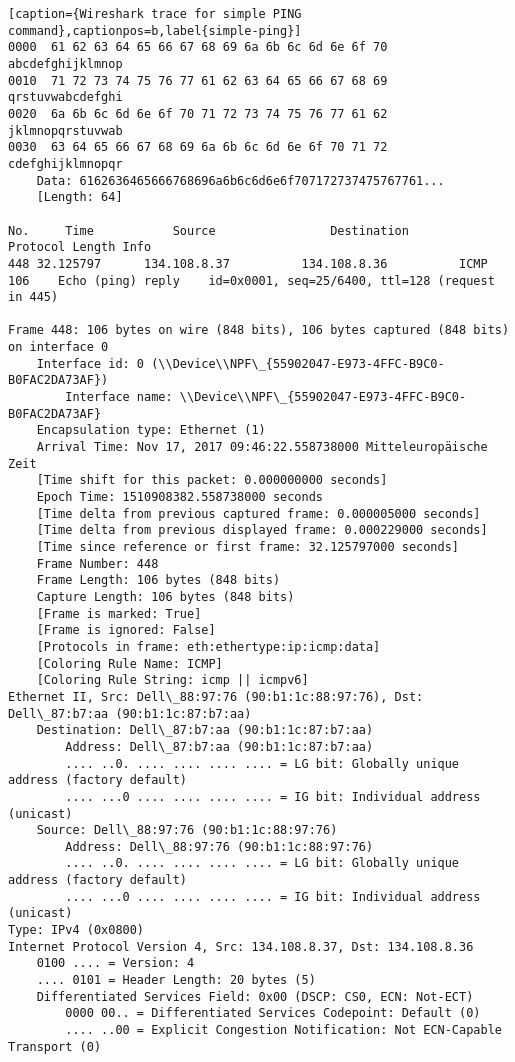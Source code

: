 \begin{lstlisting}[caption={Wireshark trace for simple PING command},captionpos=b,label{simple-ping}]
0000  61 62 63 64 65 66 67 68 69 6a 6b 6c 6d 6e 6f 70   abcdefghijklmnop
0010  71 72 73 74 75 76 77 61 62 63 64 65 66 67 68 69   qrstuvwabcdefghi
0020  6a 6b 6c 6d 6e 6f 70 71 72 73 74 75 76 77 61 62   jklmnopqrstuvwab
0030  63 64 65 66 67 68 69 6a 6b 6c 6d 6e 6f 70 71 72   cdefghijklmnopqr
	Data: 6162636465666768696a6b6c6d6e6f707172737475767761...
	[Length: 64]

No.     Time           Source                Destination           Protocol Length Info
448 32.125797      134.108.8.37          134.108.8.36          ICMP     106    Echo (ping) reply    id=0x0001, seq=25/6400, ttl=128 (request in 445)

Frame 448: 106 bytes on wire (848 bits), 106 bytes captured (848 bits) on interface 0
	Interface id: 0 (\\Device\\NPF\_{55902047-E973-4FFC-B9C0-B0FAC2DA73AF})
		Interface name: \\Device\\NPF\_{55902047-E973-4FFC-B9C0-B0FAC2DA73AF}
	Encapsulation type: Ethernet (1)
	Arrival Time: Nov 17, 2017 09:46:22.558738000 Mitteleuropäische Zeit
	[Time shift for this packet: 0.000000000 seconds]
	Epoch Time: 1510908382.558738000 seconds
	[Time delta from previous captured frame: 0.000005000 seconds]
	[Time delta from previous displayed frame: 0.000229000 seconds]
	[Time since reference or first frame: 32.125797000 seconds]
	Frame Number: 448
	Frame Length: 106 bytes (848 bits)
	Capture Length: 106 bytes (848 bits)
	[Frame is marked: True]
	[Frame is ignored: False]
	[Protocols in frame: eth:ethertype:ip:icmp:data]
	[Coloring Rule Name: ICMP]
	[Coloring Rule String: icmp || icmpv6]
Ethernet II, Src: Dell\_88:97:76 (90:b1:1c:88:97:76), Dst: Dell\_87:b7:aa (90:b1:1c:87:b7:aa)
	Destination: Dell\_87:b7:aa (90:b1:1c:87:b7:aa)
		Address: Dell\_87:b7:aa (90:b1:1c:87:b7:aa)
		.... ..0. .... .... .... .... = LG bit: Globally unique address (factory default)
		.... ...0 .... .... .... .... = IG bit: Individual address (unicast)
	Source: Dell\_88:97:76 (90:b1:1c:88:97:76)
		Address: Dell\_88:97:76 (90:b1:1c:88:97:76)
		.... ..0. .... .... .... .... = LG bit: Globally unique address (factory default)
		.... ...0 .... .... .... .... = IG bit: Individual address (unicast)
Type: IPv4 (0x0800)
Internet Protocol Version 4, Src: 134.108.8.37, Dst: 134.108.8.36
	0100 .... = Version: 4
	.... 0101 = Header Length: 20 bytes (5)
	Differentiated Services Field: 0x00 (DSCP: CS0, ECN: Not-ECT)
		0000 00.. = Differentiated Services Codepoint: Default (0)
		.... ..00 = Explicit Congestion Notification: Not ECN-Capable Transport (0)

\end{lstlisting}
